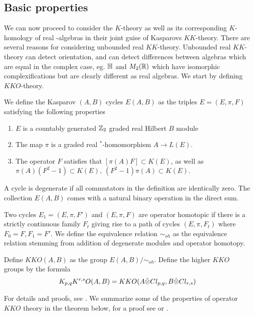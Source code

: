 \subsection{Basic properties}
We can now proceed to consider the $K$-theory as well as its corresponding $K$-homology of real \Cstar-algebras in their joint guise of Kasparovs $KK$-theory. There are several reasons for considering unbounded real $KK$-theory. Unbounded real $KK$-theory can detect orientation, and can detect differences between algebras which are equal in the complex case, eg. $\mathbb{H}$ and $M_2(\mathbb{R})$ which have isomorphic complexifications but are clearly different as real algebras. We start by defining $KKO$-theory. 
\begin{definition}
	We define the Kasparov $(A,B)$ cycles $E(A,B)$ as the triples $E=(E,\pi,F)$ satisfying the following properties
	\begin{enumerate}
		\item
			$E$ is a countably generated $\mathbb{Z}_2$ graded real Hilbert $B$ module 
		\item
			The map $\pi$ is a graded real $^*$-homomorphism $A\to L(E)$. 
		\item
			The operator $F$ satisfies that $[\pi(A)F]\subset K(E)$, as well as $\pi(A)(F^2-1)\subset K(E),~(F^2-1)\pi(A)\subset K(E)$. 
	\end{enumerate}
	A cycle is degenerate if all commutators in the definition are identically zero. The collection $E(A,B)$ comes with a natural binary operation in the direct sum. 
\end{definition}
\begin{definition}
	Two cycles $E_1=(E,\pi,F')$ and $(E,\pi,F)$ are operator homotopic if there is a strictly continuous family $F_t$ giving rise to a path of cycles $(E,\pi,F_t)$ where $F_0=F,F_1=F'$. We define the equivalence relation $\sim_{oh}$ as the equivalence relation stemming from addition of degenerate modules and operator homotopy. 
\end{definition}
\begin{definition}
	Define $KKO(A,B)$ as the group $E(A,B)/\sim_{oh}$. 
	Define the higher $KKO$ groups by the formula 
	\begin{align*}
		K_{p,q}K^{r,s}O(A,B)=KKO(A\hat{\otimes} Cl_{p,q},B\hat{\otimes} Cl_{r,s})
	\end{align*}
\end{definition}
For details and proofs, see \cite{kasparov}. 
We summarize some of the properties of operator $KKO$ theory in the theorem below, for a proof see \cite{kasparov} or \cite{schroder}.
